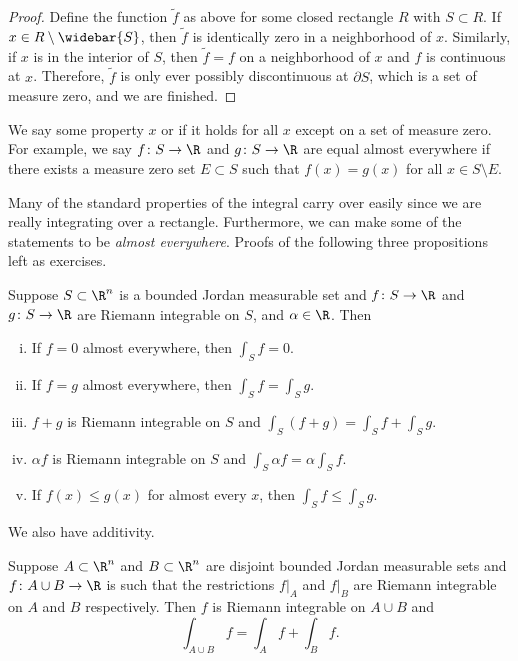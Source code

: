 \begin{proof}
Define the function $\widetilde{f}$ as above for some closed rectangle $R$ with $S
\subset R$.  If $x \in R \setminus \widebar{S}$, then $\widetilde{f}$
is identically zero in a neighborhood of $x$.  Similarly, if $x$ is in the
interior of $S$, then $\widetilde{f} = f$ on a neighborhood of $x$
and $f$ is continuous at $x$.  Therefore, $\widetilde{f}$ is only ever
possibly discontinuous at $\partial S$, which is a set of measure zero,
and we are finished.
\end{proof}

We say some property
\emph{ $x$} or
\emph{}
if it holds
for all $x$ except on a set of measure zero.
For example,
we say $f \colon S \to \R$ and $g \colon S \to \R$ are equal almost
everywhere if there exists a measure zero set $E \subset S$ such that
$f(x) = g(x)$ for all $x \in S \setminus E$.

\medskip

Many of the standard properties of the integral carry over easily
since we are really integrating over a rectangle.  Furthermore, we can
make some of the statements to be \emph{almost everywhere}.
Proofs of the following three propositions left as exercises.

\begin{prop} \label{prop:jordanintbasic}
Suppose $S \subset \R^n$ is a bounded Jordan measurable set
and $f \colon S \to \R$ and
$g \colon S \to \R$ are Riemann integrable on $S$, and $\alpha \in \R$.
Then
\begin{enumerate}[(i)]
\item
If $f = 0$ almost everywhere, then $\int_S f = 0$.
\item
If $f = g$ almost everywhere, then $\int_S f = \int_S g$.
\item
$f+g$ is Riemann integrable on $S$ and $\int_S (f+g) = \int_S f + \int_S
g$.
\item
$\alpha f$ is Riemann integrable on $S$ and $\int_S \alpha f = \alpha \int_S f$.
\item
If $f(x) \leq g(x)$ for almost every $x$, then $\int_S f \leq \int_S g$.
\end{enumerate}
\end{prop}

We also have additivity.

\begin{prop} \label{prop:jordanintadd}
Suppose $A \subset \R^n$ and $B \subset \R^n$ are disjoint bounded Jordan
measurable sets and $f \colon A \cup B \to \R$
is such that the restrictions $f|_A$ and $f|_B$
are Riemann integrable on $A$ and $B$ respectively.
Then $f$ is Riemann integrable on $A \cup B$
and
\begin{equation*}
\int_{A \cup B} f = \int_A f + \int_B f .
\end{equation*}
\end{prop}

